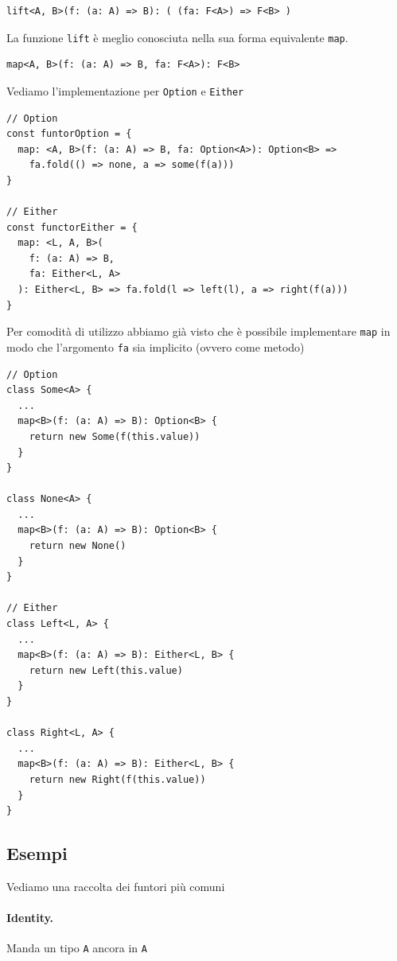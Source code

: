 \documentclass[12pt]{article}
\begin{document}
\begin{verbatim}
lift<A, B>(f: (a: A) => B): ( (fa: F<A>) => F<B> )
\end{verbatim}

La funzione \texttt{lift} è meglio conosciuta nella sua forma equivalente \texttt{map}.

\begin{verbatim}
map<A, B>(f: (a: A) => B, fa: F<A>): F<B>
\end{verbatim}

Vediamo l'implementazione per \texttt{Option} e \texttt{Either}

\begin{verbatim}
// Option
const funtorOption = {
  map: <A, B>(f: (a: A) => B, fa: Option<A>): Option<B> =>
    fa.fold(() => none, a => some(f(a)))
}

// Either
const functorEither = {
  map: <L, A, B>(
    f: (a: A) => B,
    fa: Either<L, A>
  ): Either<L, B> => fa.fold(l => left(l), a => right(f(a)))
}
\end{verbatim}

Per comodità di utilizzo abbiamo già visto che è possibile implementare \texttt{map} in modo che
l'argomento \texttt{fa} sia implicito (ovvero come metodo)

\begin{verbatim}
// Option
class Some<A> {
  ...
  map<B>(f: (a: A) => B): Option<B> {
    return new Some(f(this.value))
  }
}

class None<A> {
  ...
  map<B>(f: (a: A) => B): Option<B> {
    return new None()
  }
}

// Either
class Left<L, A> {
  ...
  map<B>(f: (a: A) => B): Either<L, B> {
    return new Left(this.value)
  }
}

class Right<L, A> {
  ...
  map<B>(f: (a: A) => B): Either<L, B> {
    return new Right(f(this.value))
  }
}
\end{verbatim}

\subsection{Esempi}

Vediamo una raccolta dei funtori più comuni

\paragraph{Identity.}

Manda un tipo \texttt{A} ancora in \texttt{A}
\end{document}
